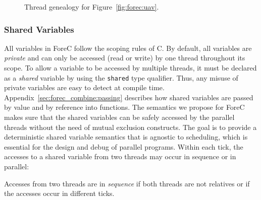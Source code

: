 \begin{figure}
	\centering

	\hfill
	
	\caption{Thread genealogy for Figure~\ref{fig:forec:uav}.}
	\label{fig:forec:uav_genealogy}
\end{figure}



\subsubsection{Shared Variables}
\label{sec:forec:shared_variables}
All variables in ForeC follow the scoping rules of C. By
default, all variables are \emph{private} and can only be
accessed (read or write) by one thread throughout its scope.
To allow a variable to be accessed by multiple threads, it
must be declared as a \emph{shared} variable by using the
\verb$shared$ type qualifier. Thus, any misuse of private variables are
easy to detect at compile time. Appendix~\ref{sec:forec_combine:passing}
describes how shared variables are passed by value and by reference into
functions. The semantics we propose for 
ForeC makes sure that the shared variables can be safely accessed
by the parallel threads without the need
of mutual exclusion constructs. The goal is to provide a
deterministic shared variable semantics that is agnostic to
scheduling, which is essential for the design and
debug of parallel programs. Within each tick, the accesses
to a shared variable from two threads may occur in sequence or 
in parallel:
\begin{definition}
	\label{def:forec:access_sequential}
	Accesses from two threads are in \emph{sequence} if both 
	threads are not relatives or if the accesses occur in different ticks. 
\end{definition}

